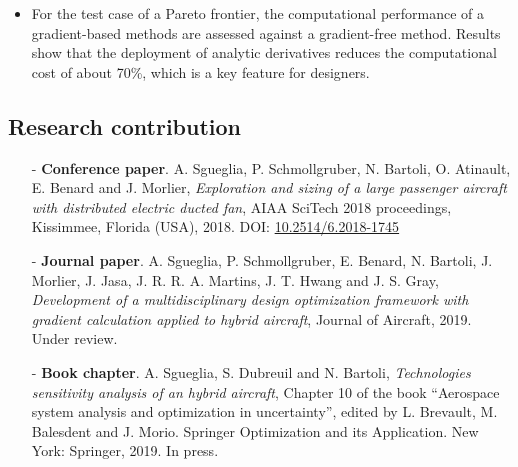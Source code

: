 \begin{mdframed}[hidealllines=true,backgroundcolor=blue!20]
\begin{itemize}
		\item For the test case of a Pareto frontier, the computational performance of a gradient-based methods are assessed against a gradient-free method. Results show that the deployment of analytic derivatives reduces the computational cost of about 70\%, which is a key feature for designers. 
		
	\end{itemize}
\end{mdframed}

\clearpage

\begin{mdframed}[hidealllines=true,backgroundcolor=green!20]
	\section*{Research contribution }
	
	\begin{itemize}
		\item[-] \textbf{Conference paper}. A. Sgueglia, P. Schmollgruber, N. Bartoli, O. Atinault, E. Benard and J. Morlier, \emph{Exploration and sizing of a large passenger aircraft with distributed electric ducted fan}, AIAA SciTech 2018 proceedings, Kissimmee, Florida (USA), 2018. DOI: \url{10.2514/6.2018-1745}
		
		\item[-] \textbf{Journal paper}. A. Sgueglia, P. Schmollgruber, E. Benard, N. Bartoli, J. Morlier, J. Jasa, J. R. R. A. Martins, J. T. Hwang and J. S. Gray, \emph{Development of a multidisciplinary design optimization framework with gradient calculation applied to hybrid aircraft}, Journal of Aircraft, 2019. Under review. 
		
		\item[-] \textbf{Book chapter}. A. Sgueglia, S. Dubreuil and N. Bartoli, \emph{Technologies sensitivity analysis of an hybrid aircraft}, Chapter 10 of the book ``Aerospace system analysis and optimization in uncertainty'', edited by L. Brevault, M. Balesdent and J. Morio. Springer Optimization and its Application. New York: Springer, 2019. In press. 
		
	\end{itemize}
\end{mdframed}